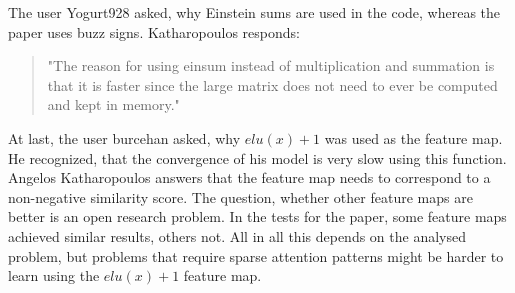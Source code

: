 \documentclass[DIV=13,fontsize=11pt]{scrartcl}
\begin{document}
The user Yogurt928 asked, why Einstein sums are used in the code, whereas the paper uses buzz signs. Katharopoulos responds: 
\begin{quote}
"The reason for using einsum instead of multiplication and summation is that it is faster since the large matrix does not need to ever be computed and kept in memory."
\end{quote}

At last, the user burcehan asked, why \(elu(x) + 1\) was used as the feature map.  He recognized, that the convergence of his model is very slow using this function.
Angelos Katharopoulos answers that the feature map needs to correspond to a non-negative similarity score. The question, whether other feature maps are better is an open research problem. In the tests for the paper, some feature maps achieved similar results, others not. All in all this depends on the analysed problem, but problems that require sparse attention patterns might be harder to learn using the \(elu(x) + 1\) feature map.







\end{document}
